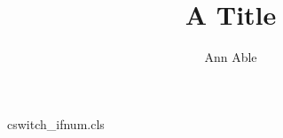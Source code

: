 \begin{filecontents*}[overwrite]{cswitch_ifnum.cls}
\newcount\addrn
\def\@addri{}\def\@addrii{}
\newcommand\address[1]{\global\advance\addrn by 1
  \ifnum\addrn=1 \gdef\@addri{#1}\else\gdef\@addrii{#1}\fi}
\def\@maketitle{\newpage\null\vskip 2em\begin{center}{\LARGE\@title\par}\vskip 1.5em
  {\large\@author\par}\vskip 1em{\@addri\par\@addrii\par}\end{center}\par\vskip 1.5em}
\end{filecontents*}
\documentclass{cswitch_ifnum}
\title{A Title}\author{Ann Able}
\address{Lunar Institute}\address{Gravel Road}
\maketitle
Body text.

